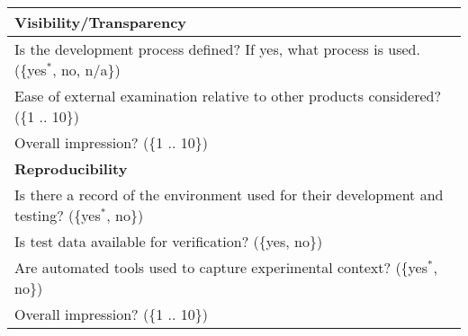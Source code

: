 \begin{longtable}{p{16cm}}
  \midrule
  \textbf{Visibility/Transparency}\\
  \midrule

Is the development process defined? If yes, what process is used. (\{yes$^*$,
no, n/a\})\\
  Ease of external examination relative to other products
  considered?  (\{1 .. 10\})\\
  Overall impression? (\{1 .. 10\})\\

  \midrule
  \textbf{Reproducibility}\\
  \midrule

  Is there a record of the environment used for their development and testing?
  (\{yes$^*$, no\})\\
  Is test data available for verification?  (\{yes, no\})\\
Are automated tools used to capture experimental context? (\{yes$^*$, no\})\\
Overall impression? (\{1 .. 10\})\\

  \bottomrule

\end{longtable}